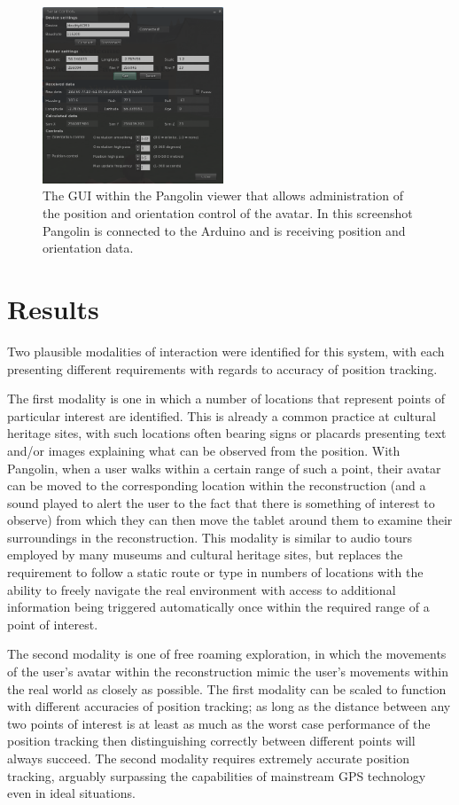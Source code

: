 \begin{figure}[h]
\centering
\includegraphics[width=0.48\textwidth]{images/figure_9}
\caption{The GUI within the Pangolin viewer that allows administration of the position and orientation control of the avatar. In this screenshot Pangolin is connected to the Arduino and is receiving position and orientation data.}
\label{pangolin_screenshot}
\end{figure}

\section{Results}
Two plausible modalities of interaction were identified for this system, with each presenting different requirements with regards to accuracy of position tracking.

The first modality is one in which a number of locations that represent points of particular interest are identified. This is already a common practice at cultural heritage sites, with such locations often bearing signs or placards presenting text and/or images explaining what can be observed from the position. With Pangolin, when a user walks within a certain range of such a point, their avatar can be moved to the corresponding location within the reconstruction (and a sound played to alert the user to the fact that there is something of interest to observe) from which they can then move the tablet around them to examine their surroundings in the reconstruction. This modality is similar to audio tours employed by many museums and cultural heritage sites, but replaces the requirement to follow a static route or type in numbers of locations with the ability to freely navigate the real environment with access to additional information being triggered automatically once within the required range of a point of interest.

The second modality is one of free roaming exploration, in which the movements of the user's avatar within the reconstruction mimic the user's movements within the real world as closely as possible.
The first modality can be scaled to function with different accuracies of position tracking; as long as the distance between any two points of interest is at least as much as the worst case performance of the position tracking then distinguishing correctly between different points will always succeed. The second modality requires extremely accurate position tracking, arguably surpassing the capabilities of mainstream GPS technology even in ideal situations.


